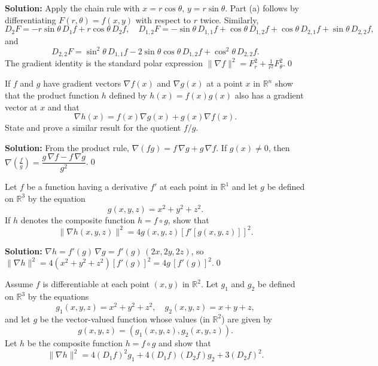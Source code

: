 \noindent\textbf{Solution:}
Apply the chain rule with $x=r\cos\theta$, $y=r\sin\theta$. Part (a) follows by differentiating $F(r,\theta)=f(x,y)$ with respect to $r$ twice. Similarly,
\[D_2F=-r\sin\theta\,D_1f+r\cos\theta\,D_2f,\quad D_{1,2}F=-\sin\theta\,D_{1,1}f+\cos\theta\,D_{1,2}f+\cos\theta\,D_{2,1}f+\sin\theta\,D_{2,2}f,\]
and
\[D_{2,2}F=\sin^2\!\theta\,D_{1,1}f-2\sin\theta\cos\theta\,D_{1,2}f+\cos^2\!\theta\,D_{2,2}f.\]
The gradient identity is the standard polar expression $\|\nabla f\|^2=F_r^2+\tfrac{1}{r^2}F_\theta^2$.\qed


\begin{problembox}
If \( f \) and \( g \) have gradient vectors \( \nabla f(x) \) and \( \nabla g(x) \) at a point \( x \) in \( \mathbb{R}^n \) show that the product function \( h \) defined by \( h(x) = f(x)g(x) \) also has a gradient vector at \( x \) and that
\[\nabla h(x) = f(x)\nabla g(x) + g(x)\nabla f(x).\]
State and prove a similar result for the quotient \( f/g \).
\end{problembox}

\noindent\textbf{Solution:}
From the product rule, $\nabla(fg)=f\,\nabla g+g\,\nabla f$. If $g(x)\ne0$, then $\nabla\!\left(\frac{f}{g}\right)=\dfrac{g\,\nabla f-f\,\nabla g}{g^2}$.\qed


\begin{problembox}
Let \( f \) be a function having a derivative \( f' \) at each point in \( \mathbb{R}^1 \) and let \( g \) be defined on \( \mathbb{R}^3 \) by the equation
\[g(x, y, z) = x^2 + y^2 + z^2.\]
If \( h \) denotes the composite function \( h = f \circ g \), show that
\[\| \nabla h(x, y, z) \|^2 = 4g(x, y, z)[f'[g(x, y, z)]]^2.\]
\end{problembox}

\noindent\textbf{Solution:}
$\nabla h=f'(g)\,\nabla g=f'(g)\,(2x,2y,2z)$, so $\|\nabla h\|^2=4(x^2+y^2+z^2)[f'(g)]^2=4g\,[f'(g)]^2$.\qed


\begin{problembox}
Assume \( f \) is differentiable at each point \( (x, y) \) in \( \mathbb{R}^2 \). Let \( g_1 \) and \( g_2 \) be defined on \( \mathbb{R}^3 \) by the equations
\[g_1(x, y, z) = x^2 + y^2 + z^2, \quad g_2(x, y, z) = x + y + z,\]
and let \( g \) be the vector-valued function whose values (in \( \mathbb{R}^2 \)) are given by
\[g(x, y, z) = (g_1(x, y, z), g_2(x, y, z)).\]
Let \( h \) be the composite function \( h = f \circ g \) and show that
\[\| \nabla h \|^2 = 4(D_1f)^2g_1 + 4(D_1f)(D_2f)g_2 + 3(D_2f)^2.\]
\end{problembox}

